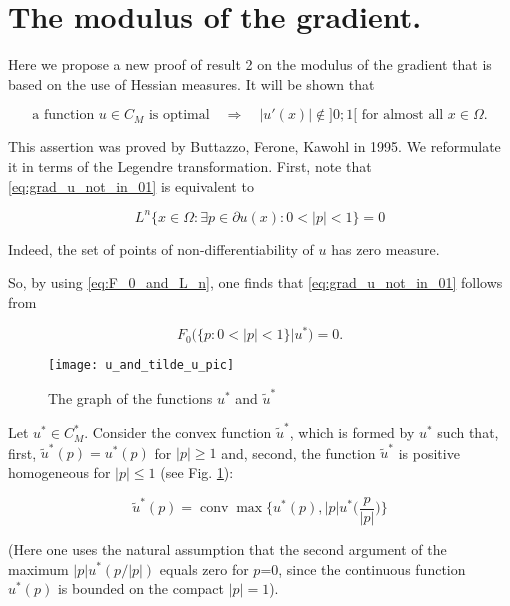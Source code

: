 \documentclass[14pt]{extarticle}
\renewcommand{\le}{\leqslant}
\renewcommand{\ge}{\geqslant}
\DeclareMathOperator{\conv}{\mathrm{conv}}
\theoremstyle{remark}
\theoremstyle{definition}
\begin{document}
\section{The modulus of the gradient.}

Here we propose a new proof of result 2 on the modulus of the gradient that is based on the use of Hessian measures. It will be shown that

\begin{equation}
\label{eq:grad_u_not_in_01}
	\mbox{a function }u\in C_M\mbox{ is optimal}
	\quad\Longrightarrow\quad
	|u'(x)|\not\in]0;1[\mbox{ for almost all }x\in\Omega.
\end{equation}

This assertion was proved by Buttazzo, Ferone, Kawohl \cite{Buttazzo1995} in 1995. We reformulate it in terms of the Legendre transformation. First, note that \eqref{eq:grad_u_not_in_01} is equivalent to

\[
	L^n\Big\{
		x\in \Omega: \exists p\in\partial u(x): 0<|p|<1
	\Big\} = 0
\]

\noindent Indeed, the set of points of non-differentiability of $u$ has zero measure.

So, by using \eqref{eq:F_0_and_L_n}, one finds that \eqref{eq:grad_u_not_in_01} follows from

\begin{equation}
\label{eq:F_0_0_l_p_l_1_eq_1}
	F_0\big(\{ p:0<|p|<1 \}|u^*\big) = 0.
\end{equation}

\begin{figure}[ht]
  \begin{center}
    \texttt{[image: u\_and\_tilde\_u\_pic]}
  \end{center}
  \caption{The graph of the functions $u^*$ and $\tilde u^*$}
  \label{fig:u_and_tilde_u}
\end{figure}

Let $u^*\in C_M^*$. Consider the convex function $\tilde u^*$, which is formed by $u^*$ such that, first, $\tilde u^*(p)=u^*(p)$ for $|p|\ge 1$ and, second, the function $\tilde u^*$ is positive homogeneous for $|p|\le 1$ (see Fig. \ref{fig:u_and_tilde_u}):

\[
	\tilde u^*(p) = \conv\max\Big\{u^*(p),|p|u^*\Big(\frac{p}{|p|}\Big)\Big\}
\]

\noindent (Here one uses the natural assumption that the second argument of the maximum $|p|u^*(p/|p|)$ equals zero for $p$=0, since the continuous function $u^*(p)$ is bounded on the compact $|p|=1$).
\end{document}
